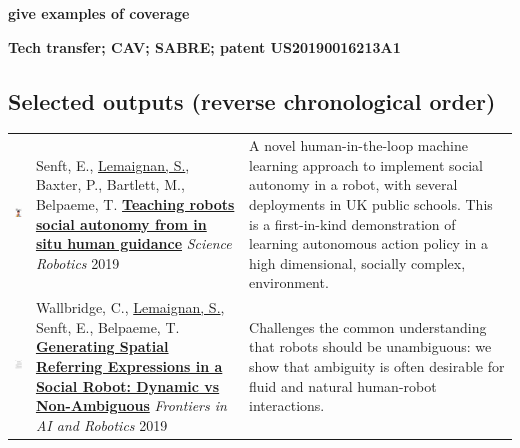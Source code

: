 \documentclass[11pt,a4paper]{report}
\newcommand{\TODO}[1]{{\color{red}\textbf{#1}}}
\begin{document}
\TODO{give examples of coverage}

\TODO{Tech transfer; CAV; SABRE; patent US20190016213A1}

\newpage
\subsection{Selected outputs (reverse chronological order)}

\hspace*{-0.5cm}\begin{tabular}{p{1.7cm}p{7cm}p{8cm}}

    \vspace{-0.2cm}\includegraphics[height=2.2cm]{thumbs/2019-science.png} & Senft, E.,
    \ul{Lemaignan, S.}, Baxter, P., Bartlett, M., Belpaeme, T.
    \newline\href{https://doi.org/10.1126/scirobotics.aat1186}{\textbf{Teaching robots
    social autonomy from in situ human guidance}}
    \newline \textit{Science Robotics} 2019
    & \small A novel human-in-the-loop machine learning approach
    to implement social autonomy in a robot, with several deployments in UK
    public schools. This is a first-in-kind demonstration of learning autonomous
    action policy in a high dimensional, socially complex,
    environment.\textbf{} \\


    \vspace{-.20cm}\includegraphics[height=2.2cm]{thumbs/2019-frontiers-chris.jpg} &

    Wallbridge, C., \ul{Lemaignan, S.}, Senft, E., Belpaeme, T.  
    \newline\href{https://doi.org/10.3389/frobt.2019.00067}{\textbf{Generating
    Spatial Referring Expressions in a Social Robot: Dynamic vs Non-Ambiguous}}
    \newline \textit{Frontiers in AI and Robotics} 2019
    & \small Challenges the common understanding that robots should be
    unambiguous: we show that ambiguity is often desirable for fluid and natural
    human-robot interactions.\textbf{}  \\


\end{tabular}
\end{document}
